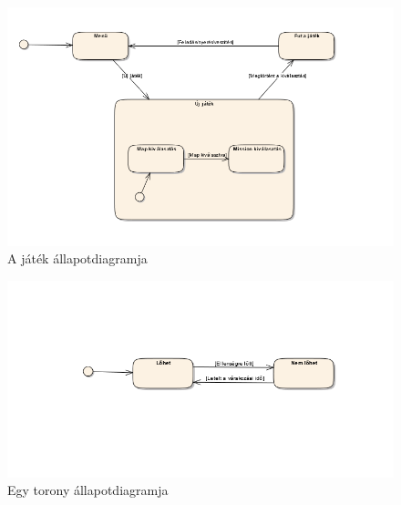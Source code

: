 \begin{figure}[H]
\begin{center}
\includegraphics[width=15cm]{images/ch04/game_state.png}
\caption{A játék állapotdiagramja}
\label{fig:game_state}
\end{center}
\end{figure}

\begin{figure}[H]
\begin{center}
\includegraphics[width=15cm]{images/ch04/tower_state.png}
\caption{Egy torony állapotdiagramja}
\label{fig:tower_state}
\end{center}
\end{figure}

